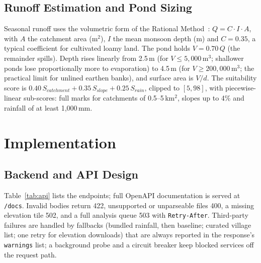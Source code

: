 \documentclass[manuscript,screen,review]{acmart}
\begin{document}
\subsection{Runoff Estimation and Pond Sizing}
Seasonal runoff uses the volumetric form of the Rational Method~\cite{chow1988}: $Q = C\cdot I\cdot A$, with $A$ the catchment area (m$^2$), $I$ the mean monsoon depth (m) and $C = 0.35$, a typical coefficient for cultivated loamy land. The pond holds $V = 0.70\,Q$ (the remainder spills). Depth rises linearly from 2.5\,m (for $V \le 5{,}000$\,m$^3$; shallower ponds lose proportionally more to evaporation) to 4.5\,m (for $V \ge 200{,}000$\,m$^3$; the practical limit for unlined earthen banks), and surface area is $V/d$. The suitability score is $0.40\,S_{catchment} + 0.35\,S_{slope} + 0.25\,S_{rain}$, clipped to $[5, 98]$, with piecewise-linear sub-scores: full marks for catchments of 0.5--5\,km$^2$, slopes up to 4\% and rainfall of at least 1,000\,mm.

\section{Implementation}
\label{sec:implementation}

\subsection{Backend and API Design}
Table~\ref{tab:api} lists the endpoints; full OpenAPI documentation is served at \texttt{/docs}. Invalid bodies return 422, unsupported or unparseable files 400, a missing elevation tile 502, and a full analysis queue 503 with \texttt{Retry-After}. Third-party failures are handled by fallbacks (bundled rainfall, then baseline; curated village list; one retry for elevation downloads) that are always reported in the response's \texttt{warnings} list; a background probe and a circuit breaker keep blocked services off the request path.
\end{document}
